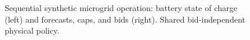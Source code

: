 \begin{figure}[t]
\begin{tikzpicture}[x=0.145cm,y=1.50000cm,font=\scriptsize]
\end{tikzpicture}
\caption{Sequential synthetic microgrid operation: battery state of charge (left) and forecasts, caps, and bids (right). Shared bid-independent physical policy.}
\end{figure}
